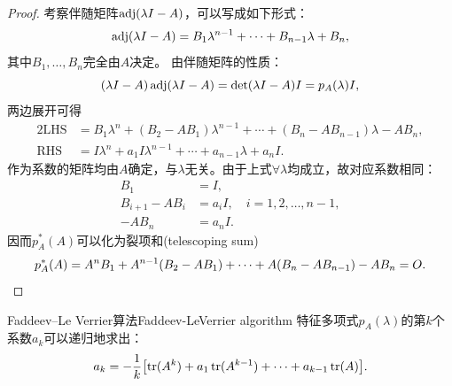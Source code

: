 

\begin{proof}
	考察伴随矩阵$\operatorname{adj}(\lambda I - A)$，可以写成如下形式：
	\[
		\operatorname{adj}(\lambda I - A) = B_1\lambda^{n-1} + \cdots + B_{n-1}\lambda + B_n,
	\]
	其中$B_1,\ldots,B_n$完全由$A$决定。
	由伴随矩阵的性质：
	\[
		(\lambda I - A)\operatorname{adj}(\lambda I - A) = \det(\lambda I - A)I = p_A(\lambda)I,
	\]
	两边展开可得
	\begin{alignat*}{2}
		\mathrm{LHS} &= B_1\lambda^n + (B_2 - AB_1)\lambda^{n-1} + \cdots + (B_n - AB_{n-1})\lambda - AB_n,\\
		\mathrm{RHS} &= I\lambda^n + a_1I\lambda^{n-1} + \cdots + a_{n-1}\lambda + a_nI.
	\end{alignat*}
	作为系数的矩阵均由$A$确定，与$\lambda$无关。由于上式$\forall\lambda$均成立，故对应系数相同：
	\begin{equation}\label{eq:la-adjugate-coefficient-recurrence}
		\begin{aligned}
			B_1 &= I,\\
			B_{i+1} - AB_i &= a_iI,\quad i = 1,2,\ldots,n - 1,\\
			-AB_n &= a_nI.
		\end{aligned}
	\end{equation}
	因而$p_A^*(A)$可以化为裂项和(telescoping sum)
	\[
		p_A^*(A) = A^nB_1 + A^{n-1}(B_2 - AB_1) + \cdots + A(B_n - AB_{n-1}) - AB_n = O.
		\qedhere
	\]
\end{proof}

\begin{theorem}
	{Faddeev--Le Verrier算法}{Faddeev-LeVerrier algorithm}
	特征多项式$p_A(\lambda)$的第$k$个系数$a_k$可以递归地求出：
	\begin{equation}
		a_k = -\frac1k\bigl[\operatorname{tr}(A^k) + a_1\operatorname{tr}(A^{k-1}) + \cdots + a_{k-1}\operatorname{tr}(A)\bigr].
	\end{equation}
\end{theorem}

